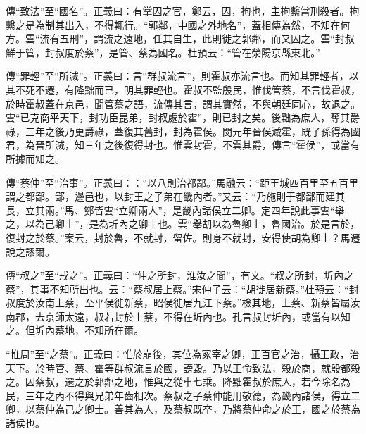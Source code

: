 {\noindent\zhuan{}\fzbyks 傳“致法”至“國名”。正義曰：有掌囚之官，鄭云，囚，拘也，主拘繫當刑殺者。拘繫之是為制其出入，不得輒行。“郭鄰，中國之外地名”，蓋相傳為然，不知在何方。雲“流宥五刑”，謂流之遠地，任其自生，此則徙之郭鄰，而又囚之。雲“封叔鮮于管，封叔度於蔡”，是管、蔡為國名。杜預云：“管在滎陽京縣東北。” \par}

{\noindent\zhuan{}\fzbyks 傳“罪輕”至“所滅”。正義曰：言“群叔流言”，則霍叔亦流言也。而知其罪輕者，以其不死不遷，有降黜而已，明其罪輕也。霍叔不監殷民，惟伐管蔡，不言伐霍叔，於時霍叔蓋在京邑，聞管蔡之語，流傳其言，謂其實然，不與朝廷同心，故退之。雲“已克商平天下，封功臣昆弟，封叔處於霍”，則已封之矣。後黜為庶人，奪其爵祿，三年之後乃更爵祿，蓋復其舊封，封為霍侯。閔元年晉侯滅霍，既子孫得為國君，為晉所滅，知三年之後復得封也。惟雲封霍，不雲其爵，傳言“霍侯”，或當有所據而知之。 \par}

{\noindent\zhuan{}\fzbyks 傳“蔡仲”至“治事”。正義曰：：“以八則治都鄙。”馬融云：“距王城四百里至五百里謂之都鄙。鄙，邊邑也，以封王之子弟在畿內者。”又云：“乃施則于都鄙而建其長，立其兩。”馬、鄭皆雲“立卿兩人”，是畿內諸侯立二卿。定四年說此事雲“舉之，以為己卿士”，是為圻內之卿士也。雲“舉胡以為魯卿士，魯國治。於是言於，復封之於蔡。”案云，封於魯，不就封，留佐。則身不就封，安得使胡為卿士？馬遷說之謬爾。 \par}

{\noindent\zhuan{}\fzbyks 傳“叔之”至“戒之”。正義曰：“仲之所封，淮汝之間”，有文。“叔之所封，圻內之蔡”，其事不知所出也。云：“蔡叔居上蔡。”宋仲子云：“胡徙居新蔡。”杜預云：“封叔度於汝南上蔡，至平侯徙新蔡，昭侯徙居九江下蔡。”檢其地，上蔡、新蔡皆屬汝南郡，去京師太遠，叔若封於上蔡，不得在圻內也。孔言叔封圻內，或當有以知之。但圻內蔡地，不知所在爾。 \par}

{\noindent\shu{}\fzkt “惟周”至“之蔡”。正義曰：惟於崩後，其位為冢宰之卿，正百官之治，攝王政，治天下。於時管、蔡、霍等群叔流言於國，謗毀。乃以王命致法，殺於商，就殷都殺之。囚蔡叔，遷之於郭鄰之地，惟與之從車七乘。降黜霍叔於庶人，若今除名為民，三年之內不得與兄弟年齒相次。蔡叔之子蔡仲能用敬德，為畿內諸侯，得立二卿，以蔡仲為己之卿士。善其為人，及蔡叔既卒，乃將蔡仲命之於王，國之於蔡為諸侯也。 \par}

